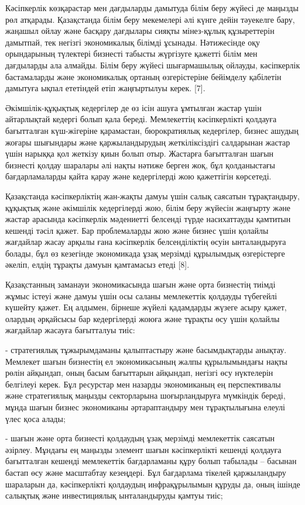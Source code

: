 \begin{multicols}{2}
Кәсіпкерлік көзқарастар мен дағдыларды дамытуда білім беру жүйесі де
маңызды рөл атқарады. Қазақстанда білім беру мекемелері әлі күнге дейін
тәуекелге бару, жаңашыл ойлау және басқару дағдылары сияқты мінез-құлық
құзыреттерін дамытпай, тек негізгі экономикалық білімді ұсынады.
Нәтижесінде оқу орындарының түлектері бизнесті табысты жүргізуге қажетті
білім мен дағдыларды ала алмайды. Білім беру жүйесі шығармашылық
ойлауды, кәсіпкерлік бастамаларды және экономикалық ортаның
өзгерістеріне бейімделу қабілетін дамытуға ықпал ететіндей етіп
жаңғыртылуы керек. {[}7{]}.

Әкімшілік-құқықтық кедергілер де өз ісін ашуға ұмтылған жастар үшін
айтарлықтай кедергі болып қала береді. Мемлекеттің кәсіпкерлікті
қолдауға бағытталған күш-жігеріне қарамастан, бюрократиялық кедергілер,
бизнес ашудың жоғары шығындары және қаржыландырудың жеткіліксіздігі
салдарынан жастар үшін нарыққа қол жеткізу қиын болып отыр. Жастарға
бағытталған шағын бизнесті қолдау шаралары әлі нақты нәтиже берген жоқ,
бұл қолданыстағы бағдарламаларды қайта қарау және кедергілерді жою
қажеттігін көрсетеді.

Қазақстанда кәсіпкерліктің жан-жақты дамуы үшін салық саясатын
тұрақтандыру, құқықтық және әкімшілік кедергілерді жою, білім беру
жүйесін жаңғырту және жастар арасында кәсіпкерлік мәдениетті белсенді
түрде насихаттауды қамтитын кешенді тәсіл қажет. Бар проблемаларды жою
және бизнес үшін қолайлы жағдайлар жасау арқылы ғана кәсіпкерлік
белсенділіктің өсуін ынталандыруға болады, бұл өз кезегінде экономикада
ұзақ мерзімді құрылымдық өзгерістерге әкеліп, елдің тұрақты дамуын
қамтамасыз етеді {[}8{]}.

Қазақстанның заманауи экономикасында шағын және орта бизнестің тиімді
жұмыс істеуі және дамуы үшін осы саланы мемлекеттік қолдауды түбегейлі
күшейту қажет. Ең алдымен, бірнеше жүйелі қадамдарды жүзеге асыру қажет,
олардың әрқайсысы бар кедергілерді жоюға және тұрақты өсу үшін қолайлы
жағдайлар жасауға бағытталуы тиіс:

- стратегиялық тұжырымдаманы қалыптастыру және басымдықтарды анықтау.
Мемлекет шағын бизнестің ел экономикасының жалпы құрылымындағы нақты
рөлін айқындап, оның басым бағыттарын айқындап, негізгі өсу нүктелерін
белгілеуі керек. Бұл ресурстар мен назарды экономиканың ең перспективалы
және стратегиялық маңызды секторларына шоғырландыруға мүмкіндік береді,
мұнда шағын бизнес экономиканы әртараптандыру мен тұрақтылығына елеулі
үлес қоса алады;

- шағын және орта бизнесті қолдаудың ұзақ мерзімді мемлекеттік саясатын
әзірлеу. Мұндағы ең маңызды элемент шағын кәсіпкерлікті кешенді қолдауға
бағытталған кешенді мемлекеттік бағдарламаны құру болып табылады --
басынан бастап өсу және масштабтау кезеңдері. Бұл бағдарлама тікелей
қаржыландыру шараларын да, кәсіпкерлікті қолдаудың инфрақұрылымын құруды
да, оның ішінде салықтық және инвестициялық ынталандыруды қамтуы тиіс;


\end{multicols}
